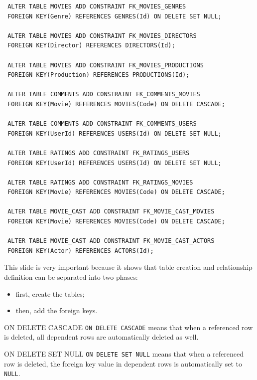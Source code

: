  \begin{verbatim}
 ALTER TABLE MOVIES ADD CONSTRAINT FK_MOVIES_GENRES
 FOREIGN KEY(Genre) REFERENCES GENRES(Id) ON DELETE SET NULL;

 ALTER TABLE MOVIES ADD CONSTRAINT FK_MOVIES_DIRECTORS
 FOREIGN KEY(Director) REFERENCES DIRECTORS(Id);

 ALTER TABLE MOVIES ADD CONSTRAINT FK_MOVIES_PRODUCTIONS
 FOREIGN KEY(Production) REFERENCES PRODUCTIONS(Id);

 ALTER TABLE COMMENTS ADD CONSTRAINT FK_COMMENTS_MOVIES
 FOREIGN KEY(Movie) REFERENCES MOVIES(Code) ON DELETE CASCADE;

 ALTER TABLE COMMENTS ADD CONSTRAINT FK_COMMENTS_USERS
 FOREIGN KEY(UserId) REFERENCES USERS(Id) ON DELETE SET NULL;

 ALTER TABLE RATINGS ADD CONSTRAINT FK_RATINGS_USERS
 FOREIGN KEY(UserId) REFERENCES USERS(Id) ON DELETE SET NULL;

 ALTER TABLE RATINGS ADD CONSTRAINT FK_RATINGS_MOVIES
 FOREIGN KEY(Movie) REFERENCES MOVIES(Code) ON DELETE CASCADE;

 ALTER TABLE MOVIE_CAST ADD CONSTRAINT FK_MOVIE_CAST_MOVIES
 FOREIGN KEY(Movie) REFERENCES MOVIES(Code) ON DELETE CASCADE;

 ALTER TABLE MOVIE_CAST ADD CONSTRAINT FK_MOVIE_CAST_ACTORS
 FOREIGN KEY(Actor) REFERENCES ACTORS(Id);
 \end{verbatim}
 \vspace{-0.4cm}

 This slide is very important because it shows that table creation and relationship definition can be separated into two phases:
 \begin{itemize}
  \item first, create the tables;
  \item then, add the foreign keys.
 \end{itemize}

 \begin{defbox}{ON DELETE CASCADE}
  \texttt{ON DELETE CASCADE} means that when a referenced row is deleted, all dependent rows are automatically deleted as well.
 \end{defbox}

 \begin{defbox}{ON DELETE SET NULL}
  \texttt{ON DELETE SET NULL} means that when a referenced row is deleted, the foreign key value in dependent rows is automatically set to \texttt{NULL}.
 \end{defbox}

